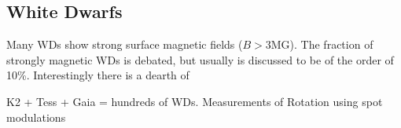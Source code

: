 {\color{red} \subsection{White Dwarfs}}
Many WDs show strong surface magnetic fields ($B>$3MG). The fraction of strongly magnetic WDs is debated, but usually is discussed to be of the order of 10\%. Interestingly there is a dearth of  

K2 + Tess + Gaia = hundreds of WDs. Measurements of Rotation using spot modulations